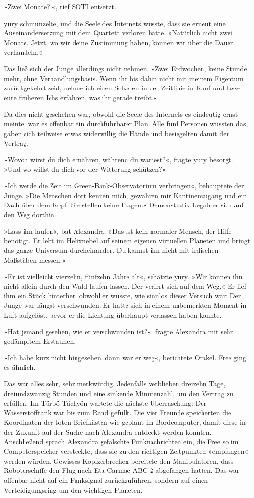 »Zwei Monate?!«, rief SOTI entsetzt.

yury schmunzelte, und die Seele des Internets wusste, dass sie erneut eine Auseinandersetzung mit dem Quartett verloren hatte. »Natürlich nicht zwei Monate. Jetzt, wo wir deine Zustimmung haben, können wir über die Dauer verhandeln.«

Das ließ sich der Junge allerdings nicht nehmen. »Zwei Erdwochen, keine Stunde mehr, ohne Verhandlungsbasis. Wenn ihr bis dahin nicht mit meinem Eigentum zurückgekehrt seid, nehme ich einen Schaden in der Zeitlinie in Kauf und lasse eure früheren Ichs erfahren, was ihr gerade treibt.«

Da dies nicht geschehen war, obwohl die Seele des Internets es eindeutig ernst meinte, war es offenbar ein durchführbarer Plan. Alle fünf Personen wussten das, gaben sich teilweise etwas widerwillig die Hände und besiegelten damit den Vertrag.

»Wovon wirst du dich ernähren, während du wartest?«, fragte yury besorgt. »Und wo willst du dich vor der Witterung schützen?«

»Ich werde die Zeit im Green-Bank-Observatorium verbringen«, behauptete der Junge. »Die Menschen dort kennen mich, gewähren mir Kantinenzugang und ein Dach über dem Kopf. Sie stellen keine Fragen.« Demonstrativ begab er sich auf den Weg dorthin.

»Lass ihn laufen«, bat Alexandra. »Das ist kein normaler Mensch, der Hilfe benötigt. Er lebt im Helixnebel auf seinem eigenen virtuellen Planeten und bringt das ganze Universum durcheinander. Du kannst ihn nicht mit irdischen Maßstäben messen.«

»Er ist vielleicht vierzehn, fünfzehn Jahre alt«, schätzte yury. »Wir können ihn nicht allein durch den Wald laufen lassen. Der verirrt sich auf dem Weg.« Er lief ihm ein Stück hinterher, obwohl er wusste, wie sinnlos dieser Versuch war: Der Junge war längst verschwunden. Er hatte sich in einem unbemerkten Moment in Luft aufgelöst, bevor er die Lichtung überhaupt verlassen haben konnte.

»Hat jemand gesehen, wie er verschwunden ist?«, fragte Alexandra mit sehr gedämpftem Erstaunen.

»Ich habe kurz nicht hingesehen, dann war er weg«, berichtete Orakel. Free ging es ähnlich.

Das war alles sehr, sehr merkwürdig. Jedenfalls verblieben dreizehn Tage, dreiundzwanzig Stunden und eine sinkende Minutenzahl, um den Vertrag zu erfüllen. Im Türbö Tächyön wartete die nächste Überraschung: Der Wasserstofftank war bis zum Rand gefüllt. Die vier Freunde speicherten die Koordinaten der toten Briefkästen wie geplant im Bordcomputer, damit diese in der Zukunft auf der Suche nach Alexandra entdeckt werden konnten. Anschließend sprach Alexandra gefälschte Funknachrichten ein, die Free so im Computerspeicher versteckte, dass sie zu den richtigen Zeitpunkten »empfangen« werden würden. Gewisses Kopfzerbrechen bereitete den Manipulatoren, dass Roboterschiffe den Flug nach Eta Carinae ABC 2 abgefangen hatten. Das war offenbar nicht auf ein Funksignal zurückzuführen, sondern auf einen Verteidigungsring um den wichtigen Planeten.

